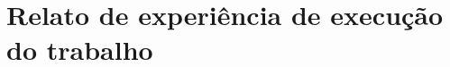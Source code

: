 \section[Relato de experiência de execução do trabalho]{Relato de experiência de execução do trabalho}
